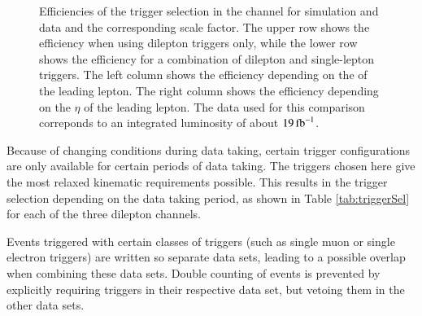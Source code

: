 \begin{figure}[htbp!]
\begin{center}
      \caption{Efficiencies of the trigger selection in the \emu channel for simulation and data and the corresponding scale factor. The upper row shows the efficiency when using dilepton triggers only, while the lower row shows
      the efficiency for a combination of dilepton and single-lepton triggers. The left column shows the efficiency depending on the \pt of the leading lepton. The right column shows the efficiency depending on the $\eta$ of the leading lepton. The data used for this comparison correponds to an integrated luminosity of about $19\mbox{\ensuremath{\,\text{fb}^\text{$-$1}}}$.}  
       \label{fig:TriggerSel}
  \end{center}
\end{figure}


Because of changing conditions during data taking, certain trigger configurations are only available for certain periods of data taking. The triggers chosen here give the most relaxed kinematic requirements possible.
This results in the trigger selection depending on the data taking period, as shown in Table \ref{tab:triggerSel} for each of the three dilepton channels.

Events triggered with certain classes of triggers (such as single muon or single electron triggers) are written so separate data sets, leading
to a possible overlap when combining these data sets.
Double counting of events is prevented by explicitly requiring triggers in their respective data set, but vetoing them in the other data sets.

